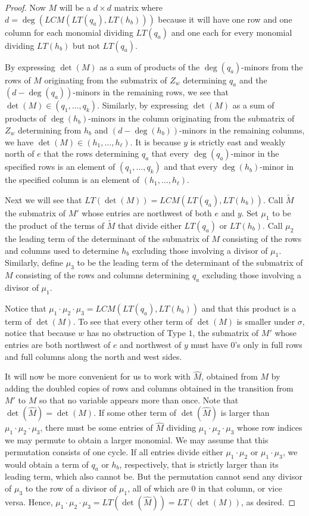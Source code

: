 \documentclass[ALCO,Unicode,published]{cedram}
\begin{document}
\begin{proof}
Now $M$ will be a $d \times d$ matrix where $d = \deg(LCM(LT(q_a),LT(h_b)))$ because it will have one row and one column for each monomial dividing $LT(q_a)$ and one each for every monomial dividing $LT(h_b)$ but not $LT(q_a)$.  

By expressing $\det(M)$ as a sum of products of the $\deg(q_a)$-minors from the rows of $M$ originating from the submatrix of $Z_w$ determining $q_a$ and the $(d-\deg(q_a))$-minors in the remaining rows, we see that $\det(M) \in (q_1, \ldots, q_k)$.  Similarly, by expressing $\det(M)$ as a sum of products of $\deg(h_b)$-minors in the column originating from the submatrix of $Z_w$ determining from $h_b$ and $(d-\deg(h_b))$-minors in the remaining columns, we have $\det(M) \in (h_1, \ldots, h_\ell)$.  It is because $y$ is strictly east and weakly north of $e$ that the rows determining $q_a$ that every $\deg(q_a)$-minor in the specified rows is an element of $(q_1, \ldots, q_k)$ and that every $\deg(h_b)$-minor in the specified column is an element of $(h_1, \ldots, h_\ell)$.

Next we will see that $LT(\det(M)) = LCM(LT(q_a),LT(h_b))$.  Call $\tilde{M}$ the submatrix of $M'$ whose entries are northwest of both $e$ and $y$.  Set $\mu_1$ to be the product of the terms of $\tilde{M}$ that divide either $LT(q_a)$ or $LT(h_b)$.  Call $\mu_2$ the leading term of the determinant of the submatrix of $M$ consisting of the rows and columns used to determine $h_b$ excluding those involving a divisor of $\mu_1$.  Similarly, define $\mu_3$ to be the leading term of the determinant of the submatrix of $M$ consisting of the rows and columns determining $q_a$ excluding those involving a divisor of $\mu_1$.  

Notice that $\mu_1 \cdot \mu_2 \cdot \mu_3 = LCM(LT(q_a),LT(h_b))$ and that this product is a term of $\det(M)$.  To see that every other term of $\det(M)$ is smaller under $\sigma$, notice that because $w$ has no obstruction of Type $1$, the submatrix of $M'$ whose entries are both northwest of $e$ and northwest of $y$ must have $0$'s only in full rows and full columns along the north and west sides.  

It will now be more convenient for us to work with $\widehat{M}$, obtained from $M$ by adding the doubled copies of rows and columns obtained in the transition from $M'$ to $M$ so that no variable appears more than once.  Note that $\det(\widehat{M}) = \det(M)$.  If some other term of $\det(\widehat{M})$ is larger than $\mu_1 \cdot \mu_2 \cdot \mu_3$, there must be some entries of $\widehat{M}$ dividing $\mu_1 \cdot \mu_2 \cdot \mu_3$ whose row indices we may permute to obtain a larger monomial.  We may assume that this permutation consists of one cycle.  If all entries divide either $\mu_1 \cdot \mu_2$ or $\mu_1\cdot \mu_3$, we would obtain a term of $q_a$ or $h_b$, respectively, that is strictly larger than its leading term, which also cannot be.  But the permutation cannot send any divisor of $\mu_3$ to the row of a divisor of $\mu_1$, all of which are $0$ in that column, or vice versa.  Hence, $\mu_1 \cdot \mu_2 \cdot \mu_3 = LT(\det(\widehat{M})) = LT(\det(M))$, as desired.


\end{proof}
\end{document}
